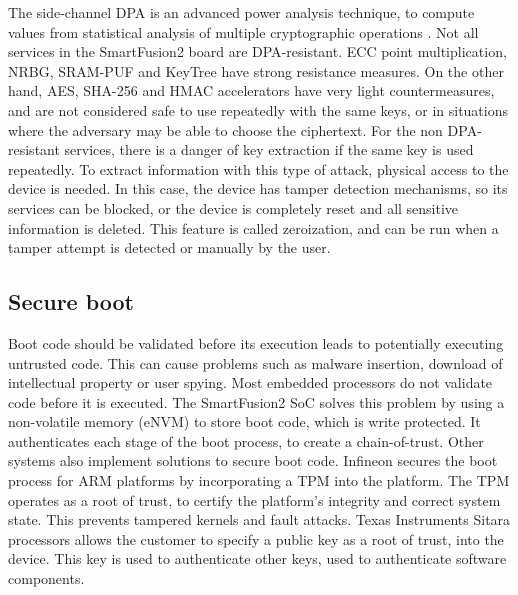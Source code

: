 The side-channel \ac{DPA} is an advanced power analysis technique, to compute values from statistical analysis of multiple cryptographic operations \cite{kocher1999differential}.
Not all services in the SmartFusion2 board are \ac{DPA}-resistant. ECC point multiplication, \ac{NRBG}, SRAM-PUF and KeyTree have strong resistance measures.
On the other hand, AES, SHA-256 and HMAC accelerators have very light countermeasures, and are not considered safe to use repeatedly with the same keys, or in situations where the adversary may be able to choose the ciphertext.
For the non \ac{DPA}-resistant services, there is a danger of key extraction if the same key is used repeatedly.
To extract information with this type of attack, physical access to the device is needed. In this case, the device has tamper detection mechanisms, so its services can be blocked, or the device is completely reset and all sensitive information is deleted.
This feature is called zeroization, and can be run when a tamper attempt is detected or manually by the user.

\subsection*{Secure boot}

Boot code should be validated before its execution leads to potentially executing untrusted code. This can cause problems such as malware insertion, download of intellectual property or user spying.
Most embedded processors do not validate code before it is executed. The SmartFusion2 \ac{SoC} solves this problem by using a non-volatile memory (eNVM) to store boot code, which is write protected. It authenticates each stage of the boot process, to create a chain-of-trust.
Other systems also implement solutions to secure boot code. Infineon secures the boot process for ARM platforms by incorporating a \ac{TPM} into the platform. The \ac{TPM} operates as a root of trust, to certify the platform's integrity and correct system state. This prevents tampered kernels and fault attacks.
Texas Instruments Sitara processors allows the customer to specify a public key as a root of trust, into the device. This key is used to authenticate other keys, used to authenticate software components.

